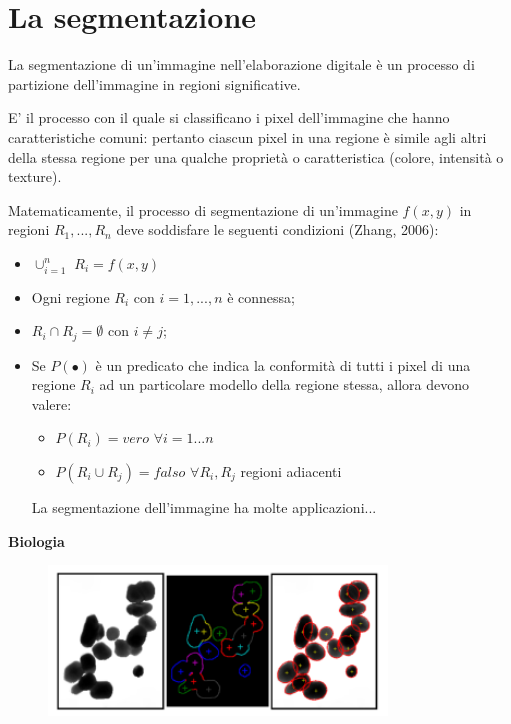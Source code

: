 \section{La segmentazione}

La segmentazione di un'immagine nell'elaborazione digitale è un processo di partizione dell'immagine in regioni significative.

\begin{definition}
    E' il processo con il quale si classificano i pixel dell'immagine che hanno caratteristiche comuni: pertanto ciascun pixel in una regione
    è simile agli altri della stessa regione per una qualche proprietà o caratteristica (colore, intensità o texture).
\end{definition}

Matematicamente, il processo di segmentazione di un'immagine $f(x,y)$ in regioni $R_1,...,R_n$ deve soddisfare le seguenti condizioni (Zhang, 2006):

\begin{itemize}
    \item $\cup^n_{i=1}$ $R_i = f(x,y)$
    \item Ogni regione $R_i$ con $i=1,...,n$ è connessa;
    \item $R_i \cap R_j = \emptyset$ con $i \neq j$;
    \item Se $P(•)$ è un predicato che indica la conformità di tutti i pixel
          di una regione $R_i$ ad un particolare modello della regione
          stessa, allora devono valere:
          \begin{itemize}
              \item $P(R_i) = vero$ $\forall i = 1...n$
              \item $P(R_i \cup R_j) = falso$ $\forall R_i, R_j$ regioni adiacenti
          \end{itemize}
          La segmentazione dell'immagine ha molte applicazioni...
\end{itemize}

\textbf{Biologia}

\begin{figure}[H]
    \centering
    \includegraphics[width=9cm, keepaspectratio]{capitoli/immagini/imgs/biologia.png}
\end{figure}


